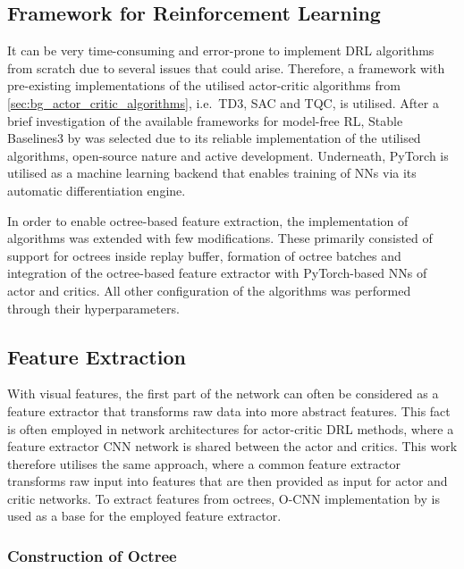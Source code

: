 \subsection{Framework for Reinforcement Learning}

It can be very time-consuming and error-prone to implement DRL algorithms from scratch due to several issues that could arise. Therefore, a framework with pre-existing implementations of the utilised actor-critic algorithms from \autoref{sec:bg_actor_critic_algorithms}, i.e.~TD3, SAC and TQC, is utilised. After a brief investigation of the available frameworks for model-free RL, Stable Baselines3 by \citet{raffin_stable-baselines3_2019} was selected due to its reliable implementation of the utilised algorithms, open-source nature and active development. Underneath, PyTorch \cite{paszke_pytorch_2019} is utilised as a machine learning backend that enables training of NNs via its automatic differentiation engine.

In order to enable octree-based feature extraction, the implementation of algorithms was extended with few modifications. These primarily consisted of support for octrees inside replay buffer, formation of octree batches and integration of the octree-based feature extractor with PyTorch-based NNs of actor and critics. All other configuration of the algorithms was performed through their hyperparameters.


\subsection{Feature Extraction}\label{subsec:feature_extraction}

With visual features, the first part of the network can often be considered as a feature extractor that transforms raw data into more abstract features. This fact is often employed in network architectures for actor-critic DRL methods, where a feature extractor CNN network is shared between the actor and critics. This work therefore utilises the same approach, where a common feature extractor transforms raw input into features that are then provided as input for actor and critic networks. To extract features from octrees, O-CNN implementation by \citet{wang_o-cnn_2017} is used as a base for the employed feature extractor.


\subsubsection{Construction of Octree}

